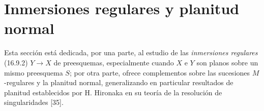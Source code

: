\section{Inmersiones regulares y planitud normal}
\label{section:IV.19}

Esta sección está dedicada, por una parte, al estudio de las \emph{inmersiones regulares} (16.9.2) $Y\to X$ de preesquemas, especialmente cuando $X$ e $Y$ son planos sobre un mismo preesquema $S$; por otra parte, ofrece complementos sobre las sucesiones $M$-regulares y la planitud normal, generalizando en particular resultados de planitud establecidos por H. Hironaka en su teoría de la resolución de singularidades [35].
